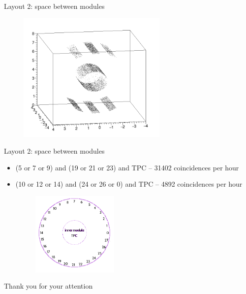 \documentclass{beamer}
\newcommand{\backupbegin}{
   \newcounter{finalframe}
   \setcounter{finalframe}{\value{framenumber}}
}
\newcommand{\backupend}{
   \setcounter{framenumber}{\value{finalframe}}
}
\begin{document}
\begin{frame}{Layout 2: space between modules}
\begin{figure}
\includegraphics[width=0.65\textwidth]{images/spaces.png}
\end{figure}
\end{frame}

\begin{frame}{Layout 2: space between modules}
\begin{itemize}
\item (5 or 7 or 9) and (19 or 21 or 23) and TPC -- 31402 coincidences per hour
\item (10 or 12 or 14) and (24 or 26 or 0) and TPC -- 4892 coincidences per hour
\begin{figure}
\includegraphics[width=0.4\textwidth]{images/nocoin.png}
\end{figure}
\end{itemize}
\end{frame}

\begin{frame}
\vfill
\centering
\Huge{Thank you for your attention}

\vfill
\end{frame}

\end{document}
